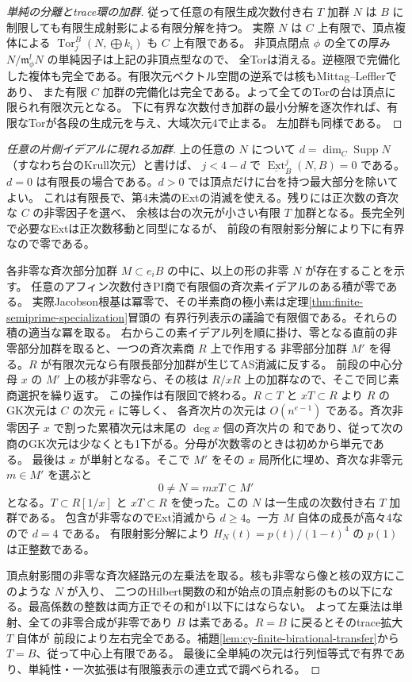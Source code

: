 \begin{proof}[単純の分離とtrace環の加群]
従って任意の有限生成次数付き右 $T$ 加群 $N$ は $B$ に制限しても有限生成射影による有限分解を持つ。
実際 $N$ は $C$ 上有限で、頂点複体による $\operatorname{Tor}^B_j(N,\bigoplus k_i)$ も $C$ 上有限である。
非頂点閉点 $\phi$ の全ての厚み $N/\mathfrak m_\phi^l N$ の単純因子は上記の非頂点型なので、
全Torは消える。逆極限で完備化した複体も完全である。有限次元ベクトル空間の逆系では核もMittag--Lefflerであり、
また有限 $C$ 加群の完備化は完全である。よって全てのTorの台は頂点に限られ有限次元となる。
下に有界な次数付き加群の最小分解を逐次作れば、有限なTorが各段の生成元を与え、大域次元4で止まる。
左加群も同様である。
\end{proof}

\begin{proof}[任意の片側イデアルに現れる加群]
上の任意の $N$ について $d=\dim_C\operatorname{Supp}N$（すなわち台のKrull次元）と書けば、
$j<4-d$ で $\underline{\operatorname{Ext}}_B^j(N,B)=0$ である。
$d=0$ は有限長の場合である。$d>0$ では頂点だけに台を持つ最大部分を除いてよい。
これは有限長で、第4未満のExtの消滅を使える。残りには正次数の斉次な $C$ の非零因子を選べ、
余核は台の次元が小さい有限 $T$ 加群となる。長完全列で必要なExtは正次数移動と同型になるが、
前段の有限射影分解により下に有界なので零である。

各非零な斉次部分加群 $M\subset e_iB$ の中に、以上の形の非零 $N$ が存在することを示す。
任意のアフィン次数付きPI商で有限個の斉次素イデアルのある積が零である。
実際Jacobson根基は冪零で、その半素商の極小素は定理\ref{thm:finite-semiprime-specialization}冒頭の
有界行列表示の議論で有限個である。それらの積の適当な冪を取る。
右からこの素イデアル列を順に掛け、零となる直前の非零部分加群を取ると、一つの斉次素商 $R$ 上で作用する
非零部分加群 $M'$ を得る。$R$ が有限次元なら有限長部分加群が生じてAS消滅に反する。
前段の中心分母 $x$ の $M'$ 上の核が非零なら、その核は $R/xR$ 上の加群なので、そこで同じ素商選択を繰り返す。
この操作は有限回で終わる。$R\subset T$ と $xT\subset R$ より $R$ のGK次元は $C$ の次元 $e$ に等しく、
各斉次片の次元は $O(n^{e-1})$ である。斉次非零因子 $x$ で割った累積次元は末尾の $\deg x$ 個の斉次片の
和であり、従って次の商のGK次元は少なくとも1下がる。分母が次数零のときは初めから単元である。
最後は $x$ が単射となる。そこで $M'$ をその $x$ 局所化に埋め、斉次な非零元 $m\in M'$ を選ぶと
\[
                       0\ne N=mxT\subset M'
\]
となる。$T\subset R[1/x]$ と $xT\subset R$ を使った。この $N$ は一生成の次数付き右 $T$ 加群である。
包含が非零なのでExt消滅から $d\ge4$。一方 $M$ 自体の成長が高々4なので $d=4$ である。
有限射影分解により $H_N(t)=p(t)/(1-t)^4$ の $p(1)$ は正整数である。

頂点射影間の非零な斉次経路元の左乗法を取る。核も非零なら像と核の双方にこのような $N$ が入り、
二つのHilbert関数の和が始点の頂点射影のもの以下になる。最高係数の整数は両方正でその和が1以下にはならない。
よって左乗法は単射、全ての非零合成が非零であり $B$ は素である。$R=B$ に戻るとそのtrace拡大 $T$ 自体が
前段により左右完全である。補題\ref{lem:cy-finite-birational-transfer}から $T=B$、従って中心上有限である。
最後に全単純の次元は行列恒等式で有界であり、単純性・一次拡張は有限箙表示の連立式で調べられる。
\end{proof}
